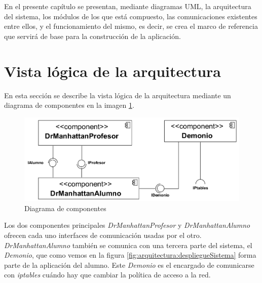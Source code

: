 

\label{chap:arquitectura}

En el presente capítulo se presentan, mediante diagramas UML\cite{UML:2004, UML2:2004}, la arquitectura del sistema\cite{ARQ:2010}, los módulos de los que está compuesto, las comunicaciones existentes entre ellos, y el funcionamiento del mismo, es decir, se crea el marco de referencia que servirá de base para la construcción de la aplicación.

\chaptertoc

\section{Vista lógica de la arquitectura}
\label{sec:arquitectura:arqLogica}

En esta sección se describe la vista lógica de la arquitectura mediante un diagrama de componentes en la imagen \ref{fig:arquitectura:componentes}.
\newline


\begin{figure}
    \centering
    \includegraphics[width=.75\linewidth]{arquitectura/componentes}
    \caption{Diagrama de componentes}
    \label{fig:arquitectura:componentes}
\end{figure}


Los dos componentes principales \emph{DrManhattanProfesor} y \emph{DrManhattanAlumno} ofrecen cada uno interfaces de comunicación usadas por el otro. \emph{DrManhattanAlumno} también se comunica con una tercera parte del sistema, el \emph{Demonio}, que como vemos en la figura \ref{fig:arquitectura:despliegueSistema} forma parte de la aplicación del alumno. Este \emph{Demonio} es el encargado de comunicarse con \emph{iptables} cuándo hay que cambiar la política de acceso a la red.
\newline

